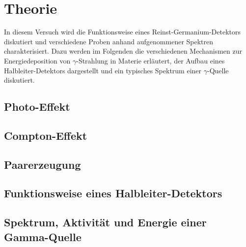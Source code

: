 \section{Theorie}
\label{sec:Theorie}

In diesem Versuch wird die Funktionsweise eines Reinst-Germanium-Detektors diskutiert
und verschiedene Proben anhand aufgenommener Spektren charakterisiert.
Dazu werden im Folgenden die verschiedenen Mechanismen zur Energiedeposition von
$\gamma$-Strahlung in Materie erläutert, der Aufbau eines Halbleiter-Detektors
dargestellt und ein typisches Spektrum einer $\gamma$-Quelle diskutiert.

\subsection{Photo-Effekt}
\label{sec:Photo-Effekt}

\subsection{Compton-Effekt}
\label{sec:Compton-Effekt}

\subsection{Paarerzeugung}
\label{sec:Paarerzeugung}

\subsection{Funktionsweise eines Halbleiter-Detektors}
\label{sec:HLDetektor}

\subsection{Spektrum, Aktivität und Energie einer Gamma-Quelle}
\label{sec:TypischeQuelle}

